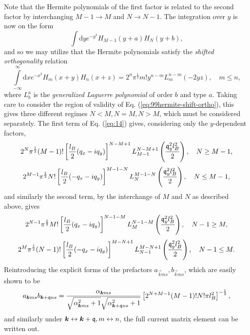 Note that the Hermite polynomials of the first factor is related to the second factor by interchanging $M-1 \to M$ and $N\to  N-1$.
The integration over $y$ is now on the form
\[
  \int \mathrm{d}y e^{-y^2} H_{M-1}(y +a) H_N(y + b),
\]
and so we may utilize that the Hermite polynomials satisfy the \emph{shifted orthogonality} relation~\cite[Eq. (7.377)]{gradshteinTableIntegralsSeries2015}
\begin{equation}
  \label{eq:99hermite-shift-ortho}
  \int\limits_{-\infty }^{\infty } \mathrm{d}x
  e^{-x^2} H_m(x+y) H_n(x+z)
  = 2^n \pi^{\frac{1}{2}} m! y^{n-m} L^{n-m}_m(-2yz), \quad m\leq n,
\end{equation}
where \(L^{a}_{b}\) is the \emph{generalized Laguerre polynomial} of order \(b\) and type \(a\).
Taking care to consider the region of validity of Eq. (\ref{eq:99hermite-shift-ortho}), this gives three different regimes $N < M, N=M, N>M$, which must be considered separately.
The first term of Eq. (\ref{eq:14}) gives, considering only the $y$-dependent factors,
\begin{equation}
  \label{eq:15}
  2^N \pi^{\frac{1}{2}}  (M-1)!
  \left[ \frac{l_B}{2} (q_x - i q_y)  \right]^{N - M + 1}
  L_{M-1}^{N-M+1} \left(\frac{\mathfrak{q}_y^2l_B^2}{2} \right), \quad N \geq M-1,
\end{equation}
\begin{equation}
  \label{eq:16}
  2^{M-1} \pi^{\frac{1}{2}}  N!
  \left[ \frac{l_B}{2} (-q_x - i q_y)  \right]^{M-1-N}
  L_{N}^{M-1-N} \left(\frac{\mathfrak{q}_y^2l_B^2}{2} \right), \quad N \leq M-1,
\end{equation}
and similarly the second term, by the interchange of $M$ and $N$ as described above, gives
\begin{equation}
  \label{eq:17}
  2^{N-1} \pi^{\frac{1}{2}}  M!
  \left[ \frac{l_B}{2} (q_x - i q_y)  \right]^{N - 1 - M}
  L_{M}^{N-1 - M} \left(\frac{\mathfrak{q}_y^2l_B^2}{2} \right), \quad N-1 \geq M,
\end{equation}
\begin{equation}
  \label{eq:18}
  2^{M} \pi^{\frac{1}{2}}  (N-1)!
  \left[ \frac{l_B}{2} (-q_x - i q_y)  \right]^{M-N + 1}
  L_{N-1}^{M-N + 1} \left(\frac{\mathfrak{q}_y^2l_B^2}{2} \right), \quad N - 1\leq M.
\end{equation}
Reintroducing the explicit forms of the prefactors $a_{\vec{k}ms}, b_{\vec{k}ms}$, which are easily shown to be
\begin{equation}
  \label{eq:19}
  a_{\vec{k}ms}b_{\vec{k}+\qvec{q} ns} = 
  \frac{\alpha_{\vec{k}ms} }{
    \sqrt{\alpha _{\vec{k} \vphantom{\qvec{q}} ms}^2 +1}
    \sqrt{\alpha _{\vec{k}+\qvec{q} ns}^2 + 1}
  }
  \left[ 2^{N+M-1} (M-1)! N! \pi l_B^2 \right]^{-\frac{1}{2}},
\end{equation}
and similarly under $\bm{k} \leftrightarrow \bm{k} + \mathfrak{q}, m \leftrightarrow n$,
the full current matrix element can be written out.

